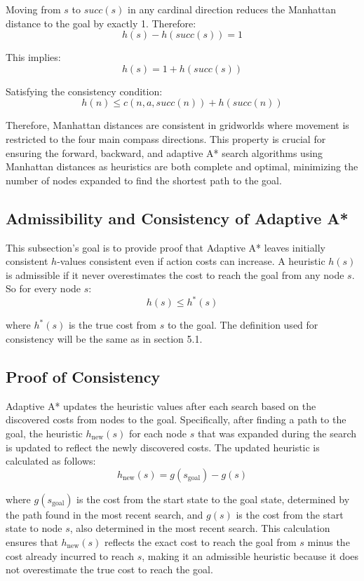 \documentclass{article}
\begin{document}
Moving from \(s\) to \(succ(s)\) in any cardinal direction reduces the Manhattan distance to the goal by exactly 1. Therefore:
\[h(s) - h(succ(s)) = 1\]

This implies:
\[h(s) = 1 + h(succ(s))\]

Satisfying the consistency condition:
\[h(n) \leq c(n, a, succ(n)) + h(succ(n))\]

Therefore, Manhattan distances are consistent in gridworlds where movement is restricted to the four main compass directions. This property is crucial for ensuring the forward, backward, and adaptive A* search algorithms using Manhattan distances as heuristics are both complete and optimal, minimizing the number of nodes expanded to find the shortest path to the goal.

\subsection{Admissibility and Consistency of Adaptive A*}
This subsection's goal is to provide proof that Adaptive A* leaves initially consistent \(h\)-values consistent even if action costs can increase. A heuristic \(h(s)\) is admissible if it never overestimates the cost to reach the goal from any node \(s\). So for every node \(s\): 
\[h(s) \leq h^*(s)\]

where \(h^*(s)\) is the true cost from \(s\) to the goal. The definition used for consistency will be the same as in section 5.1.

\subsection{Proof of Consistency}
Adaptive A* updates the heuristic values after each search based on the discovered costs from nodes to the goal. Specifically, after finding a path to the goal, the heuristic \(h_{\text{new}}(s)\) for each node \(s\) that was expanded during the search is updated to reflect the newly discovered costs. The updated heuristic is calculated as follows:
\[h_{\text{new}}(s) = g(s_{\text{goal}}) - g(s)\]

where \(g(s_{\text{goal}})\) is the cost from the start state to the goal state, determined by the path found in the most recent search, and \(g(s)\) is the cost from the start state to node \(s\), also determined in the most recent search. This calculation ensures that \(h_{\text{new}}(s)\) reflects the exact cost to reach the goal from \(s\) minus the cost already incurred to reach \(s\), making it an admissible heuristic because it does not overestimate the true cost to reach the goal.
\end{document}
